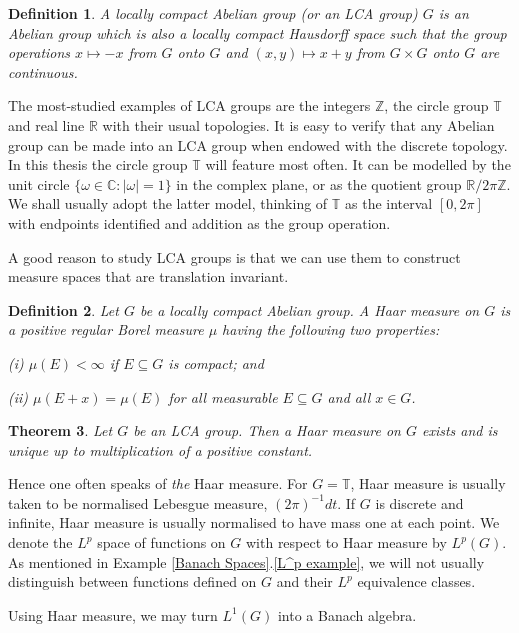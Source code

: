 \documentclass[mmath,12pt]{unswthesis}   %
\newcommand{\R}{\mathbb{R}}
\newcommand{\C}{\mathbb{C}}
\newcommand{\T}{\mathbb{T}}
\newcommand{\Z}{\mathbb{Z}}
\newcommand{\reff}[2]{\ref{#1}.\ref{#2}}
\newtheorem{theorem}{Theorem}[section]
\newtheorem{definition}[theorem]{Definition}
\numberwithin{equation}{section}
\begin{document}
\begin{definition} A {\em locally compact Abelian group} (or an LCA group)
$G$ is an Abelian group
which is also a locally compact Hausdorff space such that the group operations
$x\mapsto -x$ from $G$ onto $G$ and $(x,y)\mapsto x+y$ from $G\times G$
onto $G$ are continuous. 
\end{definition}

The most-studied examples of LCA groups are the integers $\Z$, the circle group
$\T$ and real line $\R$ with their usual topologies. 
It is easy to verify that any Abelian group can be made into an LCA group
when endowed with the discrete topology. In this thesis the circle group $\T$
will feature most often. It can be modelled by the unit circle
$\{\omega\in\C:|\omega|=1\}$
in the complex plane, or as the quotient group $\R/2\pi\Z$. We shall usually
adopt the latter model,
thinking of $\T$ as the interval $[0,2\pi]$ with endpoints identified and
addition as the group operation.

A good reason to study LCA groups is
that we can use them to construct measure spaces that are translation invariant.

\begin{definition} Let $G$ be a locally compact Abelian group. A {\em Haar
measure} on $G$ is a positive regular Borel measure $\mu$ having the
following two properties:

(i) $\mu(E)<\infty$ if $E\subseteq G$ is compact; and

(ii) $\mu(E+x)=\mu(E)$ for all measurable $E\subseteq G$ and all $x\in G$.
\end{definition}

\begin{theorem}\cite[Chapter VII, \S 2]{Katznelson}
Let $G$ be an LCA group. Then a Haar measure on $G$ exists and is unique up to
multiplication of a positive constant.
\end{theorem}

Hence one often speaks of {\em the} Haar measure. For $G=\T$, Haar measure is
usually taken to be normalised
Lebesgue measure, $(2\pi)^{-1}dt$. If $G$ is discrete and infinite, Haar measure
is usually
normalised to have mass one at each point. We denote the $L^p$ space of
functions on $G$ with respect to Haar measure by $L^p(G)$. As mentioned in
Example \reff{Banach Spaces}{L^p example}, we will not usually distinguish
between functions defined on $G$ and their $L^p$ equivalence classes.

Using Haar measure, we may turn $L^1(G)$ into a Banach algebra.
\end{document}
